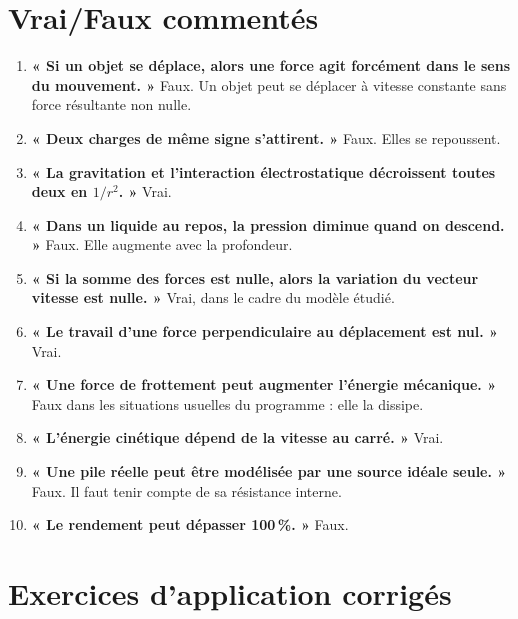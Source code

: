 \documentclass[11pt,a4paper]{article}
\begin{document}
\section{Vrai/Faux commentés}

\begin{enumerate}[label=\textbf{\arabic*.}]
    \item \textbf{« Si un objet se déplace, alors une force agit forcément dans le sens du mouvement. »}  
    Faux. Un objet peut se déplacer à vitesse constante sans force résultante non nulle.

    \item \textbf{« Deux charges de même signe s'attirent. »}  
    Faux. Elles se repoussent.

    \item \textbf{« La gravitation et l'interaction électrostatique décroissent toutes deux en $1/r^2$. »}  
    Vrai.

    \item \textbf{« Dans un liquide au repos, la pression diminue quand on descend. »}  
    Faux. Elle augmente avec la profondeur.

    \item \textbf{« Si la somme des forces est nulle, alors la variation du vecteur vitesse est nulle. »}  
    Vrai, dans le cadre du modèle étudié.

    \item \textbf{« Le travail d'une force perpendiculaire au déplacement est nul. »}  
    Vrai.

    \item \textbf{« Une force de frottement peut augmenter l'énergie mécanique. »}  
    Faux dans les situations usuelles du programme : elle la dissipe.

    \item \textbf{« L'énergie cinétique dépend de la vitesse au carré. »}  
    Vrai.

    \item \textbf{« Une pile réelle peut être modélisée par une source idéale seule. »}  
    Faux. Il faut tenir compte de sa résistance interne.

    \item \textbf{« Le rendement peut dépasser 100\,\%. »}  
    Faux.
\end{enumerate}

\section{Exercices d'application corrigés}
\end{document}
